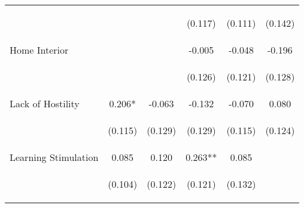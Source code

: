\begin{tabular}{lccccc}
 & \begin{footnotesize}\end{footnotesize} & \begin{footnotesize}\end{footnotesize} & \begin{footnotesize}(0.117)\end{footnotesize} & \begin{footnotesize}(0.111)\end{footnotesize} & \begin{footnotesize}(0.142)\end{footnotesize}\\
\noalign{\smallskip}Home Interior &  &  & -0.005 & -0.048 & -0.196\\
 & \begin{footnotesize}\end{footnotesize} & \begin{footnotesize}\end{footnotesize} & \begin{footnotesize}(0.126)\end{footnotesize} & \begin{footnotesize}(0.121)\end{footnotesize} & \begin{footnotesize}(0.128)\end{footnotesize}\\
\noalign{\smallskip}Lack of Hostility & 0.206* & -0.063 & -0.132 & -0.070 & 0.080\\
 & \begin{footnotesize}(0.115)\end{footnotesize} & \begin{footnotesize}(0.129)\end{footnotesize} & \begin{footnotesize}(0.129)\end{footnotesize} & \begin{footnotesize}(0.115)\end{footnotesize} & \begin{footnotesize}(0.124)\end{footnotesize}\\
\noalign{\smallskip}Learning Stimulation & 0.085 & 0.120 & 0.263** & 0.085 & \\
 & \begin{footnotesize}(0.104)\end{footnotesize} & \begin{footnotesize}(0.122)\end{footnotesize} & \begin{footnotesize}(0.121)\end{footnotesize} & \begin{footnotesize}(0.132)\end{footnotesize} & \begin{footnotesize}\end{footnotesize}\\

\end{tabular}
